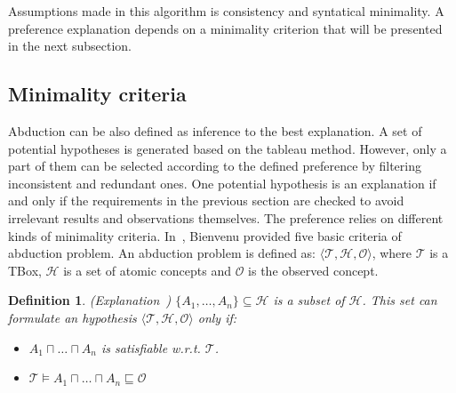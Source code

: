 \documentclass{article}
\newtheorem{mydef}{Definition}
\begin{document}
Assumptions made in this algorithm is consistency and syntatical minimality. 
A preference explanation depends on a minimality criterion that will be presented in the next subsection.


\subsection{Minimality criteria}
Abduction can be also defined as inference to the best explanation.
A set of potential hypotheses is generated based on the tableau method. However, only a part of them can be selected according to the defined preference by filtering inconsistent and redundant ones. 
One potential hypothesis is an explanation if and only if the requirements in the previous section are checked to avoid irrelevant results and observations themselves.
The preference relies on different kinds of minimality criteria. 
In~\cite{bienvenu08complexity}, Bienvenu provided five basic criteria of abduction problem.
An abduction problem is defined as: $ \langle \mathcal{T}, \mathcal{H}, \mathcal{O}\rangle$, where $\mathcal{T}$ is a TBox, $\mathcal{H}$ is a set of atomic concepts and $\mathcal{O}$ is the observed concept.

\begin{mydef}{(Explanation~\cite{bienvenu08complexity})}
$\{ A_1,\dots,A_n \} \subseteq \mathcal{H}$ is a subset of $\mathcal{H}$. This set can formulate an hypothesis $ \langle \mathcal{T}, \mathcal{H}, \mathcal{O}\rangle$ only if:
\begin{itemize}
\item  $A_1 \sqcap \dots \sqcap A_n$ is satisfiable w.r.t. $\mathcal{T}$.
\item $\mathcal{T}  \vDash  A_1 \sqcap \dots \sqcap A_n \sqsubseteq \mathcal{O}$
\end{itemize}

\end{mydef}
\end{document}
